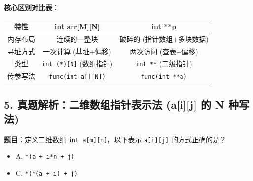 \documentclass[a4paper,12pt]{article}
\begin{document}
\textbf{核心区别对比表}：
\begin{center}
\begin{tabular}{|c|c|c|}
\hline
\textbf{特性} & \textbf{int arr[M][N]} & \textbf{int **p} \\
\hline
内存布局 & 连续的一整块 & 破碎的 (指针数组+多块数据) \\
\hline
寻址方式 & 一次计算 (基址+偏移) & 两次访问 (查表+偏移) \\
\hline
类型 & \texttt{int (*)[N]} (数组指针) & \texttt{int **} (二级指针) \\
\hline
传参写法 & \texttt{func(int a[][N])} & \texttt{func(int **a)} \\
\hline
\end{tabular}
\end{center}

\subsection{5. 真题解析：二维数组指针表示法 (a[i][j] 的 N 种写法)}
\textbf{题目}：定义二维数组 \texttt{int a[m][n]}，以下表示 \texttt{a[i][j]} 的方式正确的是？
\begin{itemize}
    \item A. \texttt{*(a + i*n + j)}
    \item C. \texttt{*(*(a + i) + j)}
\end{itemize}
\end{document}
